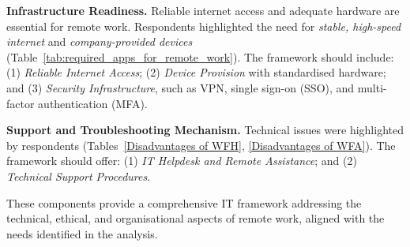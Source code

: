 \documentclass{infotel}
\begin{document}
\textbf{Infrastructure Readiness.}
Reliable internet access and adequate hardware are essential for remote work. Respondents highlighted the need for \textit{stable, high-speed internet} and \textit{company-provided devices} (Table~\ref{tab:required_apps_for_remote_work}). The framework should include: (1) \textit{Reliable Internet Access}; (2) \textit{Device Provision} with standardised hardware; and (3) \textit{Security Infrastructure}, such as VPN, single sign-on (SSO), and multi-factor authentication (MFA).

\textbf{Support and Troubleshooting Mechanism.}
Technical issues were highlighted by respondents (Tables~\ref{Disadvantages of WFH}, \ref{Disadvantages of WFA}). The framework should offer: (1) \textit{IT Helpdesk and Remote Assistance}; and (2) \textit{Technical Support Procedures}.


These components provide a comprehensive IT framework addressing the technical, ethical, and organisational aspects of remote work, aligned with the needs identified in the analysis.
\end{document}

